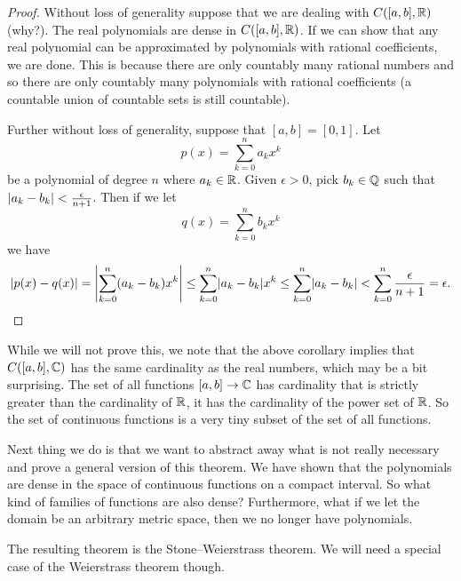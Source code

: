 \begin{proof}
Without loss of generality suppose that we are dealing with $C([a,b],{\mathbb{R}})$
(why?).
The real polynomials are dense in $C([a,b],{\mathbb{R}})$.  If we can show that
any real polynomial can be approximated by polynomials with rational
coefficients, we are done.  This is because there are only countably many
rational numbers and so there are only countably many polynomials with
rational coefficients (a countable union of countable sets is still
countable).

Further without loss of generality, suppose that $[a,b]=[0,1]$.  Let
\begin{equation*}
p(x) = \sum_{k=0}^n a_k x^k
\end{equation*}
be a polynomial of degree $n$ where $a_k \in {\mathbb{R}}$.  Given $\epsilon > 0$, pick $b_k \in {\mathbb{Q}}$
such that $\lvert {a_k-b_k} \rvert < \frac{\epsilon}{n+1}$.  Then
if we let
\begin{equation*}
q(x) = \sum_{k=0}^n b_k x^k
\end{equation*}
we have
\begin{equation*}
\lvert {p(x)-q(x)} \rvert
=
\left\lvert {\sum_{k=0}^n (a_k-b_k) x^k} \right\rvert
\leq
\sum_{k=0}^n \lvert {a_k-b_k} \rvert x^k
\leq
\sum_{k=0}^n \lvert {a_k-b_k} \rvert
<
\sum_{k=0}^n \frac{\epsilon}{n+1} = \epsilon . \qedhere
\end{equation*}
\end{proof}

\begin{remark}
While we will not prove this, we note that the above corollary implies that
$C([a,b],{\mathbb{C}})$ has the same cardinality as the real numbers, which may be a
bit surprising.  The set of all functions $[a,b] \to {\mathbb{C}}$ has
cardinality that is strictly greater than the cardinality of ${\mathbb{R}}$, it has the
cardinality of the power set of ${\mathbb{R}}$.  So the
set of continuous functions is a very tiny subset of the set of all
functions.
\end{remark}

Next thing we do is that we want to abstract away what is not really
necessary and prove a general version of this theorem.
We have shown that the polynomials are dense in the space of continuous
functions on a compact interval.  So what kind of families of
functions are also dense?  Furthermore, what if we let the domain be an
arbitrary metric space, then we no longer have polynomials.

The resulting theorem is the Stone--Weierstrass theorem.  We will need a
special case of the Weierstrass theorem though.

